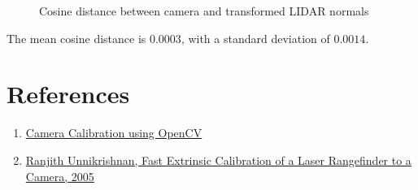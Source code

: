 \documentclass[10pt]{article}
\begin{document}
\begin{enumerate}
\begin{figure}[htbp]
\begin{center}
                \caption{Cosine distance between camera and transformed LIDAR normals}
                \label{fig:cosine-distances}
            \end{center}
        \end{figure}
        The mean cosine distance is $0.0003$, with a standard deviation of $0.0014$.
    \end{enumerate}

    \section*{\textbf{References}}
    \begin{enumerate}
        \item \href{https://learnopencv.com/camera-calibration-using-opencv/}{
            Camera Calibration using OpenCV
        }
        \item \href{https://www.ri.cmu.edu/pub_files/pub4/unnikrishnan_ranjith_2005_3/unnikrishnan_ranjith_2005_3.pdf}{
            Ranjith Unnikrishnan, Fast Extrinsic Calibration of a Laser Rangefinder to a Camera, 2005
        }
    \end{enumerate}
\end{document}
